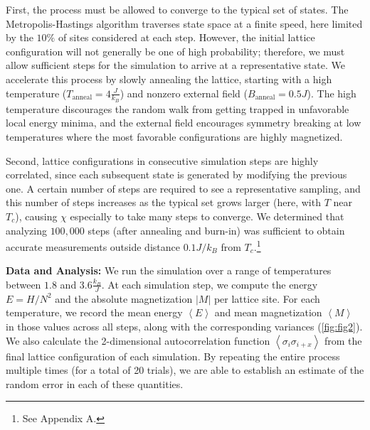 \documentclass[letter,scriptaddress,twocolumn, prl,nofootinbib]{revtex4}
\newcommand{\submin}[1]{\left\langle #1 \right\rangle}
\begin{document}
First, the process must be allowed to converge to the typical set of states. The Metropolis-Hastings algorithm traverses state space at a finite speed, here limited by the $10\%$ of sites considered at each step. However, the initial lattice configuration will not generally be one of high probability; therefore, we must allow sufficient steps for the simulation to arrive at a representative state. We accelerate this process by slowly annealing the lattice, starting with a high temperature ($T_\text{anneal} = 4 \frac{J}{k_B}$) and nonzero external field ($B_\text{anneal} = 0.5 J$). The high temperature discourages the random walk from getting trapped in unfavorable local energy minima, and the external field encourages symmetry breaking at low temperatures where the most favorable configurations are highly magnetized.

Second, lattice configurations in consecutive simulation steps are highly correlated, since each subsequent state is generated by modifying the previous one. A certain number of steps are required to see a representative sampling, and this number of steps increases as the typical set grows larger (here, with $T$ near $T_c$), causing $\chi$ especially to take many steps to converge. We determined that analyzing $100,000$ steps (after annealing and burn-in) was sufficient to obtain accurate measurements outside distance $0.1 J/k_B$ from $T_c$.\footnote{See Appendix A.}

\textbf{Data and Analysis:} We run the simulation over a range of temperatures between $1.8$ and $3.6\frac{k_B}{J}$. At each simulation step, we compute the energy $E = H / N^2$ and the absolute magnetization $|M|$ per lattice site. For each temperature, we record the mean energy $\submin{E}$ and mean magnetization $\submin{M}$ in those values across all steps, along with the corresponding variances (\autoref{fig:fig2}). We also calculate the 2-dimensional autocorrelation function $\submin{\sigma_i\sigma_{i + x}}$ from the final lattice configuration of each simulation. By repeating the entire process multiple times (for a total of 20 trials), we are able to establish an estimate of the random error in each of these quantities. 
\end{document}
